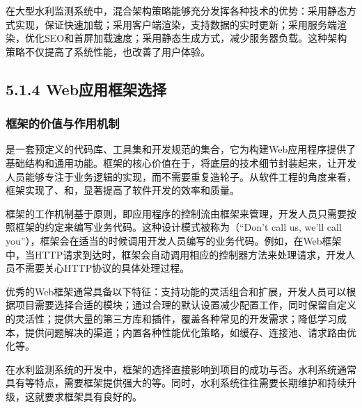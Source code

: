 在大型水利监测系统中，混合架构策略能够充分发挥各种技术的优势：采用静态方式实现，保证快速加载；采用客户端渲染，支持数据的实时更新；采用服务端渲染，优化SEO和首屏加载速度；采用静态生成方式，减少服务器负载。这种架构策略不仅提高了系统性能，也改善了用户体验。

\hypertarget{webux5e94ux7528ux6846ux67b6ux9009ux62e9}{%
\subsection{5.1.4 Web应用框架选择}\label{webux5e94ux7528ux6846ux67b6ux9009ux62e9}}

\hypertarget{ux6846ux67b6ux7684ux4ef7ux503cux4e0eux4f5cux7528ux673aux5236}{%
\subsubsection{框架的价值与作用机制}\label{ux6846ux67b6ux7684ux4ef7ux503cux4e0eux4f5cux7528ux673aux5236}}

是一套预定义的代码库、工具集和开发规范的集合，它为构建Web应用程序提供了基础结构和通用功能。框架的核心价值在于，将底层的技术细节封装起来，让开发人员能够专注于业务逻辑的实现，而不需要重复造轮子。从软件工程的角度来看，框架实现了、和，显著提高了软件开发的效率和质量。

框架的工作机制基于原则，即应用程序的控制流由框架来管理，开发人员只需要按照框架的约定来编写业务代码。这种设计模式被称为（``Don't call us, we'll call you''），框架会在适当的时候调用开发人员编写的业务代码。例如，在Web框架中，当HTTP请求到达时，框架会自动调用相应的控制器方法来处理请求，开发人员不需要关心HTTP协议的具体处理过程。

优秀的Web框架通常具备以下特征：支持功能的灵活组合和扩展，开发人员可以根据项目需要选择合适的模块；通过合理的默认设置减少配置工作，同时保留自定义的灵活性；提供大量的第三方库和插件，覆盖各种常见的开发需求；降低学习成本，提供问题解决的渠道；内置各种性能优化策略，如缓存、连接池、请求路由优化等。

在水利监测系统的开发中，框架的选择直接影响到项目的成功与否。水利系统通常具有等特点，需要框架提供强大的等。同时，水利系统往往需要长期维护和持续升级，这就要求框架具有良好的。

